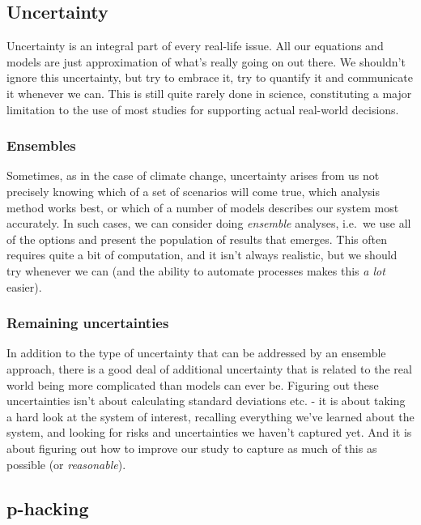 \documentclass[
]{book}
\begin{document}
\hypertarget{uncertainty}{%
\subsection{Uncertainty}\label{uncertainty}}

Uncertainty is an integral part of every real-life issue. All our equations and models are just approximation of what's really going on out there. We shouldn't ignore this uncertainty, but try to embrace it, try to quantify it and communicate it whenever we can. This is still quite rarely done in science, constituting a major limitation to the use of most studies for supporting actual real-world decisions.

\hypertarget{ensembles}{%
\subsubsection{Ensembles}\label{ensembles}}

Sometimes, as in the case of climate change, uncertainty arises from us not precisely knowing which of a set of scenarios will come true, which analysis method works best, or which of a number of models describes our system most accurately. In such cases, we can consider doing \emph{ensemble} analyses, i.e.~we use all of the options and present the population of results that emerges. This often requires quite a bit of computation, and it isn't always realistic, but we should try whenever we can (and the ability to automate processes makes this \emph{a lot} easier).

\hypertarget{remaining-uncertainties}{%
\subsubsection{Remaining uncertainties}\label{remaining-uncertainties}}

In addition to the type of uncertainty that can be addressed by an ensemble approach, there is a good deal of additional uncertainty that is related to the real world being more complicated than models can ever be. Figuring out these uncertainties isn't about calculating standard deviations etc. - it is about taking a hard look at the system of interest, recalling everything we've learned about the system, and looking for risks and uncertainties we haven't captured yet. And it is about figuring out how to improve our study to capture as much of this as possible (or \emph{reasonable}).

\hypertarget{p-hacking-1}{%
\subsection{p-hacking}\label{p-hacking-1}}
\end{document}
